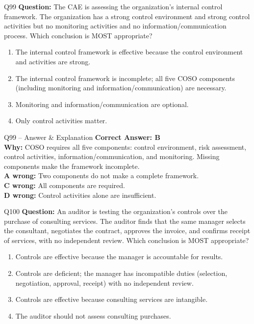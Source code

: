\documentclass[aspectratio=169,10pt]{beamer}
\begin{document}
	\begin{frame}[t]{Q99}
		\small
		\textbf{Question:} The CAE is assessing the organization's internal control framework. The organization has a strong control environment and strong control activities but no monitoring activities and no information/communication process. Which conclusion is MOST appropriate?
		\begin{enumerate}[label=\Alph*.,itemsep=1pt,topsep=2pt]
			\item The internal control framework is effective because the control environment and activities are strong.
			\item The internal control framework is incomplete; all five COSO components (including monitoring and information/communication) are necessary.
			\item Monitoring and information/communication are optional.
			\item Only control activities matter.
		\end{enumerate}
	\end{frame}
	
	\begin{frame}[t]{Q99 -- Answer \& Explanation}
		\small
		\textbf{Correct Answer: B} \\[4pt]
		\textbf{Why:} COSO requires all five components: control environment, risk assessment, control activities, information/communication, and monitoring. Missing components make the framework incomplete. \\[4pt]
		\textbf{A wrong:} Two components do not make a complete framework. \\[2pt]
		\textbf{C wrong:} All components are required. \\[2pt]
		\textbf{D wrong:} Control activities alone are insufficient.
	\end{frame}
	
	\begin{frame}[t]{Q100}
		\small
		\textbf{Question:} An auditor is testing the organization's controls over the purchase of consulting services. The auditor finds that the same manager selects the consultant, negotiates the contract, approves the invoice, and confirms receipt of services, with no independent review. Which conclusion is MOST appropriate?
		\begin{enumerate}[label=\Alph*.,itemsep=1pt,topsep=2pt]
			\item Controls are effective because the manager is accountable for results.
			\item Controls are deficient; the manager has incompatible duties (selection, negotiation, approval, receipt) with no independent review.
			\item Controls are effective because consulting services are intangible.
			\item The auditor should not assess consulting purchases.
		\end{enumerate}
	\end{frame}
	
\end{document}
